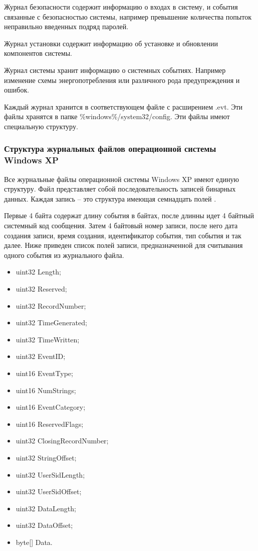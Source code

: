 Журнал безопасности содержит информацию о входах в систему, и события связанные с безопасностью системы, например превышение количества попыток неправильно введенных подряд паролей.

Журнал установки содержит информацию об установке и обновлении компонентов системы.

Журнал системы хранит информацию о системных событиях. Например изменение схемы энергопотребления или различного рода предупреждения и ошибок.

Каждый журнал хранится в соответствующем файле с расширением .evt. Эти файлы хранятся в папке \%windows\%/system32/config. Эти файлы имеют специальную структуру.

\subsubsection{Структура журнальных файлов операционной системы Windows XP}

Все журнальные файлы операционной системы Windows XP имеют единую структуру. Файл представляет собой последовательность записей бинарных данных. Каждая запись – это структура имеющая семнадцать полей \cite{evt}.

Первые 4 байта содержат длину события в байтах, после длинны идет 4 байтный системный код сообщения. Затем 4 байтовый номер записи, после него дата создания записи, время создания, идентификатор события, тип события и так далее. Ниже приведен список полей записи, предназначенной для считывания одного события из журнального файла.

\begin{itemize}
\item uint32 Length; 
\item uint32 Reserved;
\item uint32 RecordNumber;
\item uint32 TimeGenerated;
\item uint32 TimeWritten;
\item uint32 EventID;
\item uint16 EventType;
\item uint16 NumStrings;
\item uint16 EventCategory;
\item uint16 ReservedFlags;
\item uint32 ClosingRecordNumber;
\item uint32 StringOffset;
\item uint32 UserSidLength;
\item uint32 UserSidOffset;
\item uint32 DataLength;
\item uint32 DataOffset;
\item byte[] Data.
\end{itemize}

